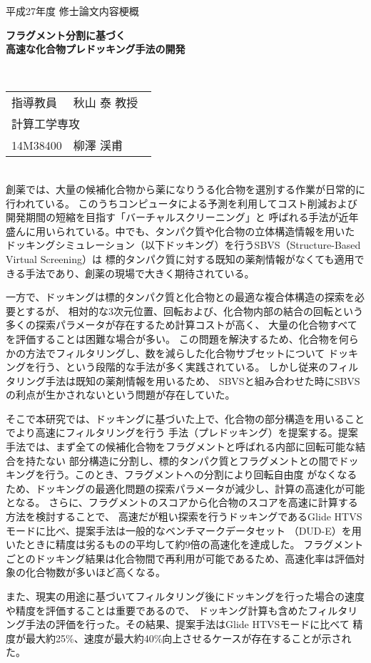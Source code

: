 {
 \thispagestyle{empty}
 \large
 \noindent
 平成27年度 修士論文内容梗概
　\\
 \begin{center}
  \textbf{\LARGE フラグメント分割に基づく\\高速な化合物プレドッキング手法の開発}
 \end{center}
　\\
 \hfill 
 \begin{tabular}{llll}
 指導教員& \multicolumn{3}{l}{秋山 泰 教授} \\
  \multicolumn{4}{l}{計算工学専攻} \\
 14M38400\hspace{.5cm} & {柳澤 渓甫}
 \end{tabular}

\mbox{}\\

創薬では、大量の候補化合物から薬になりうる化合物を選別する作業が日常的に行われている。
このうちコンピュータによる予測を利用してコスト削減および開発期間の短縮を目指す「バーチャルスクリーニング」と
呼ばれる手法が近年盛んに用いられている。中でも、タンパク質や化合物の立体構造情報を用いた
ドッキングシミュレーション（以下ドッキング）を行うSBVS（Structure-Based Virtual Screening）は
標的タンパク質に対する既知の薬剤情報がなくても適用できる手法であり、創薬の現場で大きく期待されている。

一方で、ドッキングは標的タンパク質と化合物との最適な複合体構造の探索を必要とするが、
相対的な3次元位置、回転および、化合物内部の結合の回転という多くの探索パラメータが存在するため計算コストが高く、
大量の化合物すべてを評価することは困難な場合が多い。
この問題を解決するため、化合物を何らかの方法でフィルタリングし、数を減らした化合物サブセットについて
ドッキングを行う、という段階的な手法が多く実践されている。
しかし従来のフィルタリング手法は既知の薬剤情報を用いるため、
SBVSと組み合わせた時にSBVSの利点が生かされないという問題が存在していた。

そこで本研究では、ドッキングに基づいた上で、化合物の部分構造を用いることでより高速にフィルタリングを行う
手法（プレドッキング）を提案する。提案手法では、まず全ての候補化合物をフラグメントと呼ばれる内部に回転可能な結合を持たない
部分構造に分割し、標的タンパク質とフラグメントとの間でドッキングを行う。このとき、フラグメントへの分割により回転自由度
がなくなるため、ドッキングの最適化問題の探索パラメータが減少し、計算の高速化が可能となる。
さらに、フラグメントのスコアから化合物のスコアを高速に計算する方法を検討することで、
高速だが粗い探索を行うドッキングであるGlide HTVSモードに比べ、提案手法は一般的なベンチマークデータセット
（DUD-E）を用いたときに精度は劣るものの平均して約9倍の高速化を達成した。
フラグメントごとのドッキング結果は化合物間で再利用が可能であるため、高速化率は評価対象の化合物数が多いほど高くなる。

また、現実の用途に基づいてフィルタリング後にドッキングを行った場合の速度や精度を評価することは重要であるので、
ドッキング計算も含めたフィルタリング手法の評価を行った。その結果、提案手法はGlide HTVSモードに比べて
精度が最大約25\%、速度が最大約40\%向上させるケースが存在することが示された。

\thispagestyle{empty}
\addtocounter{page}{-1}
}
